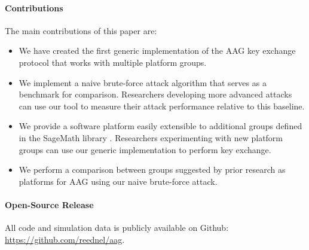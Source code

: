 \paragraph{Contributions}
The main contributions of this paper are:
\begin{itemize}
    \item We have created the first generic implementation of the AAG key exchange protocol that works with multiple platform groups.
    \item We implement a naive brute-force attack algorithm that serves as a benchmark for comparison. Researchers developing more advanced attacks can use our tool to measure their attack performance relative to this baseline.
    \item We provide a software platform easily extensible to additional groups defined in the SageMath library \cite{sagemath}. Researchers experimenting with new platform groups can use our generic implementation to perform key exchange.
    \item We perform a comparison between groups suggested by prior research as platforms for AAG using our naive brute-force attack.
\end{itemize}

\paragraph{Open-Source Release}

All code and simulation data is publicly available on Github: \url{https://github.com/reednel/aag}.
